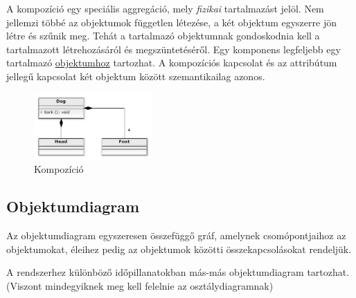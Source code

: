 \documentclass[margin=0px]{article}
\begin{document}
\begin{description}
\begin{itemize}
		 					A kompozíció egy speciális aggregáció, mely \textit{fizikai} tartalmazást jelöl. Nem jellemzi többé az objektumok független létezése, a két objektum egyszerre jön létre és szűnik meg. Tehát a tartalmazó objektumnak gondoskodnia kell a tartalmazott létrehozásáról és megszüntetéséről. Egy komponens legfeljebb egy tartalmazó \underline{objektumhoz} tartozhat. A kompozíciós kapcsolat és az attribútum jellegű kapcsolat két objektum között szemantikailag azonos.
			 					\begin{figure}[H]
			 						\centering
			 						\includegraphics[width=0.4\textwidth]{img/kompozicio.png}
			 						\caption{Kompozíció}
			 					\end{figure}
 					\end{itemize}
			\end{description}
			
		\subsection{Objektumdiagram}
			Az objektumdiagram egyszeresen összefüggő gráf, amelynek csomópontjaihoz az objektumokat, éleihez pedig az objektumok közötti összekapcsolásokat rendeljük.
			
			A rendszerhez különböző időpillanatokban más-más objektumdiagram tartozhat. (Viszont mindegyiknek meg kell felelnie az osztálydiagramnak)
			
\end{document}
